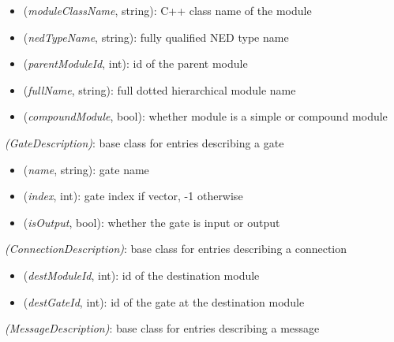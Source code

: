 \begin{itemize}
  \item {} (\textit{moduleClassName}, string): C++ class name of the module
  \item {} (\textit{nedTypeName}, string): fully qualified NED type name
  \item {} (\textit{parentModuleId}, int): id of the parent module
  \item {} (\textit{fullName}, string): full dotted hierarchical module name
  \item {} (\textit{compoundModule}, bool): whether module is a simple or compound module
\end{itemize}

 \textit{(GateDescription)}: base class for entries describing a gate

\begin{itemize}
  \item {} (\textit{name}, string): gate name
  \item {} (\textit{index}, int): gate index if vector, -1 otherwise
  \item {} (\textit{isOutput}, bool): whether the gate is input or output
\end{itemize}

 \textit{(ConnectionDescription)}: base class for entries describing a connection

\begin{itemize}
  \item {} (\textit{destModuleId}, int): id of the destination module
  \item {} (\textit{destGateId}, int): id of the gate at the destination module
\end{itemize}

 \textit{(MessageDescription)}: base class for entries describing a message

